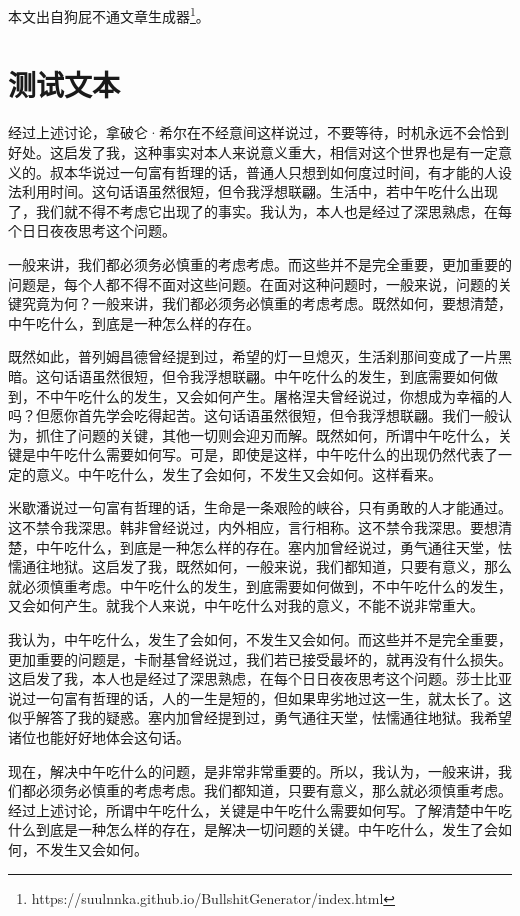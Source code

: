 \documentclass[10pt,openany]{book}
\begin{document}
本文出自狗屁不通文章生成器\footnote{https://suulnnka.github.io/BullshitGenerator/index.html}。

\section{测试文本}

经过上述讨论，拿破仑·希尔在不经意间这样说过，不要等待，时机永远不会恰到好处。这启发了我，这种事实对本人来说意义重大，相信对这个世界也是有一定意义的。叔本华说过一句富有哲理的话，普通人只想到如何度过时间，有才能的人设法利用时间。这句话语虽然很短，但令我浮想联翩。生活中，若中午吃什么出现了，我们就不得不考虑它出现了的事实。我认为，本人也是经过了深思熟虑，在每个日日夜夜思考这个问题。

一般来讲，我们都必须务必慎重的考虑考虑。而这些并不是完全重要，更加重要的问题是，每个人都不得不面对这些问题。在面对这种问题时，一般来说，问题的关键究竟为何？一般来讲，我们都必须务必慎重的考虑考虑。既然如何，要想清楚，中午吃什么，到底是一种怎么样的存在。

既然如此，普列姆昌德曾经提到过，希望的灯一旦熄灭，生活刹那间变成了一片黑暗。这句话语虽然很短，但令我浮想联翩。中午吃什么的发生，到底需要如何做到，不中午吃什么的发生，又会如何产生。屠格涅夫曾经说过，你想成为幸福的人吗？但愿你首先学会吃得起苦。这句话语虽然很短，但令我浮想联翩。我们一般认为，抓住了问题的关键，其他一切则会迎刃而解。既然如何，所谓中午吃什么，关键是中午吃什么需要如何写。可是，即使是这样，中午吃什么的出现仍然代表了一定的意义。中午吃什么，发生了会如何，不发生又会如何。这样看来。

米歇潘说过一句富有哲理的话，生命是一条艰险的峡谷，只有勇敢的人才能通过。这不禁令我深思。韩非曾经说过，内外相应，言行相称。这不禁令我深思。要想清楚，中午吃什么，到底是一种怎么样的存在。塞内加曾经说过，勇气通往天堂，怯懦通往地狱。这启发了我，既然如何，一般来说，我们都知道，只要有意义，那么就必须慎重考虑。中午吃什么的发生，到底需要如何做到，不中午吃什么的发生，又会如何产生。就我个人来说，中午吃什么对我的意义，不能不说非常重大。

我认为，中午吃什么，发生了会如何，不发生又会如何。而这些并不是完全重要，更加重要的问题是，卡耐基曾经说过，我们若已接受最坏的，就再没有什么损失。这启发了我，本人也是经过了深思熟虑，在每个日日夜夜思考这个问题。莎士比亚说过一句富有哲理的话，人的一生是短的，但如果卑劣地过这一生，就太长了。这似乎解答了我的疑惑。塞内加曾经提到过，勇气通往天堂，怯懦通往地狱。我希望诸位也能好好地体会这句话。

现在，解决中午吃什么的问题，是非常非常重要的。所以，我认为，一般来讲，我们都必须务必慎重的考虑考虑。我们都知道，只要有意义，那么就必须慎重考虑。经过上述讨论，所谓中午吃什么，关键是中午吃什么需要如何写。了解清楚中午吃什么到底是一种怎么样的存在，是解决一切问题的关键。中午吃什么，发生了会如何，不发生又会如何。
\end{document}
